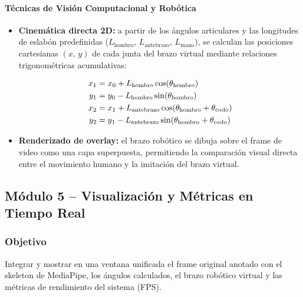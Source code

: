 \paragraph{Técnicas de Visión Computacional y Robótica}
\begin{itemize}[leftmargin=1.5em]
  \item \textbf{Cinemática directa 2D:} a partir de los ángulos
        articulares y las longitudes de eslabón predefinidas
        ($L_{\text{hombro}}$, $L_{\text{antebrazo}}$,
        $L_{\text{mano}}$), se calculan las posiciones cartesianas
        $(x,\,y)$ de cada junta del brazo virtual mediante relaciones
        trigonométricas acumulativas:
 
        \begin{align}
          x_1 &= x_0 + L_{\text{hombro}}\cos(\theta_{\text{hombro}})
          \notag \\
          y_1 &= y_0 - L_{\text{hombro}}\sin(\theta_{\text{hombro}})
          \notag \\
          x_2 &= x_1 + L_{\text{antebrazo}}
                        \cos(\theta_{\text{hombro}}
                             + \theta_{\text{codo}})
          \notag \\
          y_2 &= y_1 - L_{\text{antebrazo}}
                        \sin(\theta_{\text{hombro}}
                             + \theta_{\text{codo}})
          \label{eq:cinematica}
        \end{align}
 
  \item \textbf{Renderizado de overlay:} el brazo robótico se
        dibuja sobre el frame de video como una capa superpuesta,
        permitiendo la comparación visual directa entre el movimiento
        humano y la imitación del brazo virtual.
\end{itemize}

\subsection{Módulo 5 -- Visualización y Métricas en Tiempo Real}

\subsubsection*{Objetivo}
Integrar y mostrar en una ventana unificada el frame original anotado
con el skeleton de MediaPipe, los ángulos calculados, el
brazo robótico virtual y las métricas de rendimiento del sistema
(FPS).

